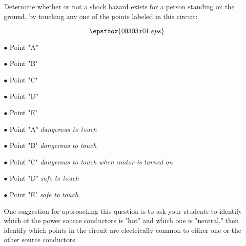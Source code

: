 

Determine whether or not a shock hazard exists for a person standing on the ground, by touching any one of the points labeled in this circuit:

$$\epsfbox{00303x01.eps}$$

\medskip
\item{$\bullet$} Point "A"
\item{$\bullet$} Point "B"
\item{$\bullet$} Point "C"
\item{$\bullet$} Point "D"
\item{$\bullet$} Point "E"
\medskip







\medskip
\item{$\bullet$} Point "A" {\it dangerous to touch}
\item{$\bullet$} Point "B" {\it dangerous to touch}
\item{$\bullet$} Point "C" {\it dangerous to touch when motor is turned on}
\item{$\bullet$} Point "D" {\it safe to touch}
\item{$\bullet$} Point "E" {\it safe to touch}
\medskip







One suggestion for approaching this question is to ask your students to identify which of the power source conductors is "hot" and which one is "neutral," then identify which points in the circuit are electrically common to either one or the other source conductors.




